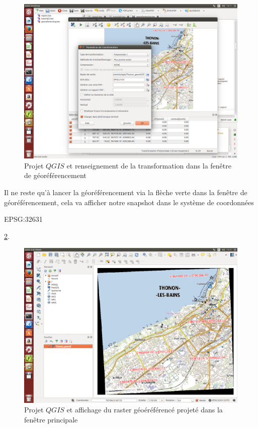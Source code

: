 \documentclass{book}
\begin{document}
\begin{figure}[H]
\begin{center}
\includegraphics[scale=0.3]{images/georeferencing/qgis-transformation.png}
\end{center}
\caption{Projet $QGIS$ et renseignement de la transformation dans la fen\^{e}tre de géoréférencement}
\label{qgis-transformation}
\end{figure}

Il ne reste qu'à lancer la géoréférencement via la flèche verte dans la fen\^{e}tre de géoréférencement, cela va afficher
notre snapshot dans le système de coordonnées \begin{itshape}EPSG:32631\end{itshape} \ref{qgis-resultat}.

\begin{figure}[H]
\begin{center}
\includegraphics[scale=0.3]{images/georeferencing/qgis-resultat.png}
\end{center}
\caption{Projet $QGIS$ et affichage du raster géoéréférencé projeté dans la fen\^{e}tre principale}
\label{qgis-resultat}
\end{figure}
\end{document}
